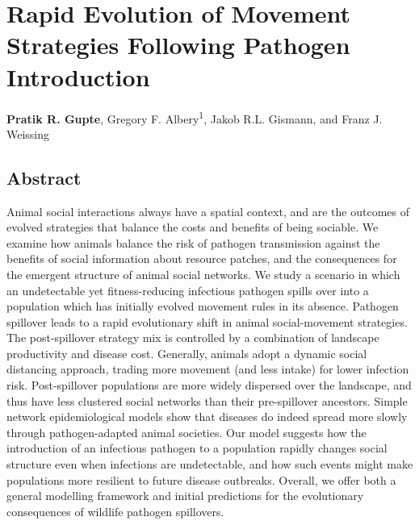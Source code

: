\chapter{Rapid Evolution of Movement Strategies Following Pathogen Introduction}\label{ch:pathomove}

\noindent \textbf{Pratik R. Gupte}, Gregory F. Albery\textsuperscript{1}, Jakob R.L. Gismann, and Franz J. Weissing


\section*{Abstract}

\small{
    Animal social interactions always have a spatial context, and are the outcomes of evolved strategies that balance the costs and benefits of being sociable.
    We examine how animals balance the risk of pathogen transmission against the benefits of social information about resource patches, and the consequences for the emergent structure of animal social networks.
    We study a scenario in which an undetectable yet fitness-reducing infectious pathogen spills over into a population which has initially evolved movement rules in its absence.
    Pathogen spillover leads to a rapid evolutionary shift in animal social-movement strategies.
    The post-spillover strategy mix is controlled by a combination of landscape productivity and disease cost.
    Generally, animals adopt a dynamic social distancing approach, trading more movement (and less intake) for lower infection risk.
    Post-spillover populations are more widely dispersed over the landscape, and thus have less clustered social networks than their pre-spillover ancestors.
    Simple network epidemiological models show that diseases do indeed spread more slowly through pathogen-adapted animal societies.
    Our model suggests how the introduction of an infectious pathogen to a population rapidly changes social structure even when infections are undetectable, and how such events might make populations more resilient to future disease outbreaks.
    Overall, we offer both a general modelling framework and initial predictions for the evolutionary consequences of wildlife pathogen spillovers.

    \medskip

}

\clearpage